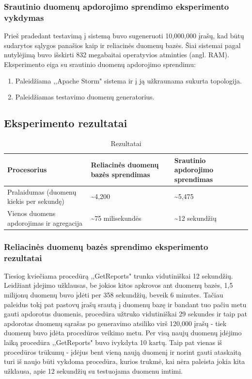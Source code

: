 \documentclass{VUMIFPSkursinis}
\begin{document}
\subsubsection{Srautinio duomenų apdorojimo sprendimo eksperimento vykdymas}

Prieš pradedant testavimą į sistemą buvo sugeneruoti 10,000,000 įrašų, kad būtų sudarytos sąlygos panašios kaip ir reliacinės duomenų bazės.
Šiai sistemai pagal nutylėjimą buvo išskirti 832 megabaitai operatyvios atminties (angl. RAM). 
Eksperimento eiga su srautinio duomenų apdorojimo sprendimu:
\begin{enumerate} 
\item Paleidžiama ,,Apache Storm" sistema ir į ją užkraunama sukurta topologija.
\item Paleidžiamas testavimo duomenų generatorius.
\end{enumerate}
\newpage
\subsection{Eksperimento rezultatai}
\begin{table}[!htbp]
    \begin{center}
        \caption{Rezultatai}
        \label{table:results}
        \begin{tabular}{ | l | p{4cm} | p{3cm} | } 
            \hline
            Procesorius & Reliacinės duomenų bazės sprendimas & Srautinio apdorojimo sprendimas \\* \hline
            Pralaidumas (duomenų kiekis per sekundę) & \textasciitilde4,200 & \textasciitilde5,475 \\* \hline
            Vienos duomens apdorojimas ir agregacija & \textasciitilde75 milisekundės & \textasciitilde12 sekundžių \\* \hline
        \end{tabular}
    \end{center}
\end{table}\par
\subsubsection{Reliacinės duomenų bazės sprendimo eksperimento rezultatai}
Tiesiog kviečiama procedūrą ,,GetReports" trunka vidutiniškai 12 sekundžių. Leidžiant įdejimo užklausas, be jokios kitos apkrovos ant duomenų bazės, 1,5 milijonų duomenų
buvo įdėti per 358 sekundžių, beveik 6 minutes. Tačiau paleidus tokį pat pastovų įrašų srautą į duomenų bazę ir bandant tuo pačiu metu gauti apdorotus duomenis,
procedūra užtruko vidutiniškai 29 sekundes ir taip pat apdorotas duomenų sąrašas po generavimo atsiliko virš 120,000 įrašų - tiek duomenų buvo įdėta procedūros veikimo metu. 
Per visą naujų duomenų įdėjimo laiką procedūra ,,GetReports" buvo ivykdyta 10 kartų.
Taip pat vienas iš procedūros trūkumų - įdėjus bent vieną naują duomenį ir norint gauti ataskaitą turi iš naujo būti vykdoma procedūra, kurios trukmė, kai nėra 
paleista jokia kita užklausa, apie 12 sekundžių su testuojama duomenu imtimi.
\end{document}
